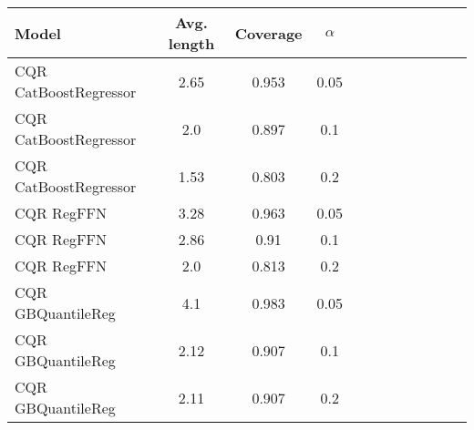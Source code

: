 \begin{table}[t] 
\centering 
\small 
\begin{tabular}{lccccccccccc} 
\toprule 
Model & Avg. length & Coverage & $\alpha$ \\ 
\midrule 
 CQR CatBoostRegressor & 2.65 & 0.953 & 0.05  \\ 
 CQR CatBoostRegressor & 2.0 & 0.897 & 0.1  \\ 
 CQR CatBoostRegressor & 1.53 & 0.803 & 0.2  \\ 
 CQR RegFFN & 3.28 & 0.963 & 0.05  \\ 
 CQR RegFFN & 2.86 & 0.91 & 0.1  \\ 
 CQR RegFFN & 2.0 & 0.813 & 0.2  \\ 
 CQR GBQuantileReg & 4.1 & 0.983 & 0.05  \\ 
 CQR GBQuantileReg & 2.12 & 0.907 & 0.1  \\ 
 CQR GBQuantileReg & 2.11 & 0.907 & 0.2  \\ 
\bottomrule 
\end{tabular} 
\end{table} 
